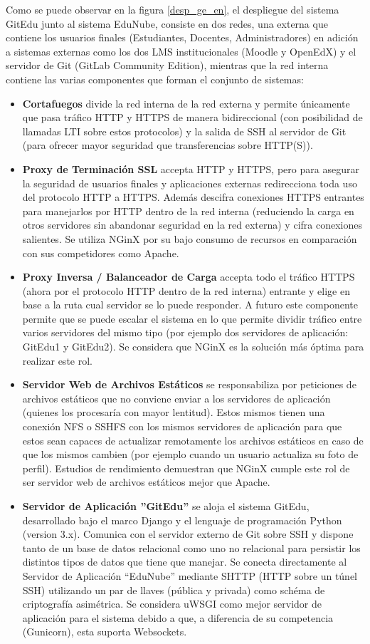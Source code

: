 Como se puede observar en la figura \ref{desp_ge_en}, el despliegue del sistema GitEdu junto al sistema EduNube, consiste en dos redes, una externa que contiene los usuarios finales (Estudiantes, Docentes, Administradores) en adición a sistemas externas como los dos LMS institucionales (Moodle y OpenEdX) y el servidor de Git (GitLab Community Edition), mientras que la red interna contiene las varias componentes que forman el conjunto de sistemas:
\begin{itemize}
	\item \textbf{Cortafuegos} divide la red interna de la red externa y permite únicamente que pasa tráfico HTTP y HTTPS de manera bidireccional (con posibilidad de llamadas LTI sobre estos protocolos) y la salida de SSH al servidor de Git (para ofrecer mayor seguridad que transferencias sobre HTTP(S)).
    \item \textbf{Proxy de Terminación SSL} accepta HTTP y HTTPS, pero para asegurar la seguridad de usuarios finales y aplicaciones externas redirecciona toda uso del protocolo HTTP a HTTPS. Además descifra conexiones HTTPS entrantes para manejarlos por HTTP dentro de la red interna (reduciendo la carga en otros servidores sin abandonar seguridad en la red externa) y cifra conexiones salientes. Se utiliza NGinX por su bajo consumo de recursos en comparación con sus competidores como Apache.
    \item \textbf{Proxy Inversa / Balanceador de Carga} accepta todo el tráfico HTTPS (ahora por el protocolo HTTP dentro de la red interna) entrante y elige en base a la ruta cual servidor se lo puede responder. A futuro este componente permite que se puede escalar el sistema en lo que permite dividir tráfico entre varios servidores del mismo tipo (por ejemplo dos servidores de aplicación: GitEdu1 y GitEdu2). Se considera que NGinX es la solución más óptima para realizar este rol.
    \item \textbf{Servidor Web de Archivos Estáticos} se responsabiliza por peticiones de archivos estáticos que no conviene enviar a los servidores de aplicación (quienes los procesaría con mayor lentitud). Estos mismos tienen una conexión NFS o SSHFS con los mismos servidores de aplicación para que estos sean capaces de actualizar remotamente los archivos estáticos en caso de que los mismos cambien (por ejemplo cuando un usuario actualiza su foto de perfil). Estudios de rendimiento demuestran que NGinX cumple este rol de ser servidor web de archivos estáticos mejor que Apache.
    \item \textbf{Servidor de Aplicación ''GitEdu''} se aloja el sistema GitEdu, desarrollado bajo el marco Django y el lenguaje de programación Python (version 3.x). Comunica con el servidor externo de Git sobre SSH y dispone tanto de un base de datos relacional como uno no relacional para persistir los distintos tipos de datos que tiene que manejar. Se conecta directamente al Servidor de Aplicación “EduNube” mediante SHTTP (HTTP sobre un túnel SSH) utilizando un par de llaves (pública y privada) como schéma de criptografía asimétrica. Se considera uWSGI como mejor servidor de aplicación para el sistema debido a que, a diferencia de su competencia (Gunicorn), esta suporta Websockets.

\end{itemize}
